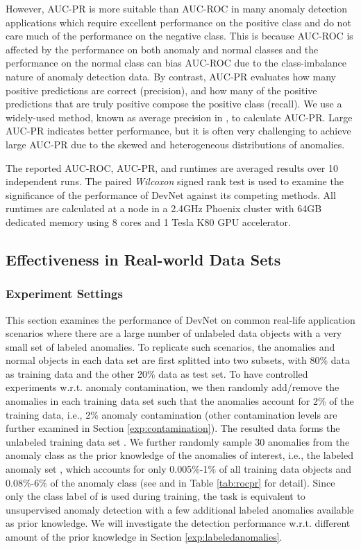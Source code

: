 \documentclass[sigconf]{acmart}
\begin{document}
However, AUC-PR is more suitable than AUC-ROC in many anomaly detection applications which require excellent performance on the positive class and do not care much of the performance on the negative class. This is because AUC-ROC is affected by the performance on both anomaly and normal classes and the performance on the normal class can bias AUC-ROC due to the class-imbalance nature of anomaly detection data. By contrast, AUC-PR evaluates how many positive predictions are correct (precision), and how many of the positive predictions that are truly positive compose the positive class (recall). We use a widely-used method, known as average precision in \cite{schutze2008introduction}, to calculate AUC-PR. Large AUC-PR indicates better performance, but it is often very challenging to achieve large AUC-PR due to the skewed and heterogeneous distributions of anomalies.

The reported AUC-ROC, AUC-PR, and runtimes are averaged results over 10 independent runs. The paired \textit{Wilcoxon} signed rank test \cite{woolson2007wilcoxon} is used to examine the significance of the performance of DevNet against its competing methods. All runtimes are calculated at a node in a 2.4GHz Phoenix cluster with 64GB dedicated memory using 8 cores and 1 Tesla K80 GPU accelerator. 



\subsection{Effectiveness in Real-world Data Sets}\label{exp:effectiveness}

\subsubsection{Experiment Settings}

This section examines the performance of DevNet on common real-life application scenarios where there are a large number of unlabeled data objects with a very small set of labeled anomalies. To replicate such scenarios, the anomalies and normal objects in each data set are first splitted into two subsets, with 80\% data as training data and the other 20\% data as test set. To have controlled experiments w.r.t. anomaly contamination, we then randomly add/remove the anomalies in each training data set such that the anomalies account for 2\% of the training data, i.e., 2\% anomaly contamination (other contamination levels are further examined in Section \ref{exp:contamination}). The resulted data forms the unlabeled training data set . We further randomly sample 30 anomalies from the anomaly class as the prior knowledge of the anomalies of interest, i.e., the labeled anomaly set , which accounts for only 0.005\%-1\% of all training data objects and 0.08\%-6\% of the anomaly class (see  and  in Table \ref{tab:rocpr} for detail). Since only the class label of  is used during training, the task is equivalent to unsupervised anomaly detection with a few additional labeled anomalies available as prior knowledge. We will investigate the detection performance w.r.t. different amount of the prior knowledge in Section \ref{exp:labeledanomalies}. 
\end{document}
